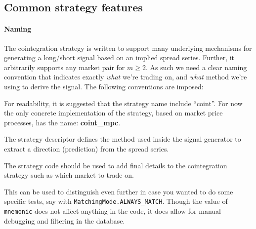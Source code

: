 \subsection{Common strategy features}
\paragraph{Naming}
The cointegration strategy is written to support many underlying mechanisms for
generating a long/short signal based on an implied spread series. Further, it
arbitrarily supports any market pair for $m\geq2$. As such we need a clear
naming convention that indicates exactly \emph{what} we're trading on, and
\emph{what} method we're using to derive the signal. The following conventions
are imposed:
\begin{description}[leftmargin=!, labelwidth=8em]
    \item[\texttt{strategy_name}] For readability, it is suggested
        that the strategy name include ``coint''. For now the only concrete
        implementation of the strategy, based on market price processes, has
        the name: \textbf{coint\_mpc}.
    \item[\texttt{strategy_desc}] The strategy descriptor defines
        the method used inside the signal generator to extract a direction
        (prediction) from the spread series.
    \item[\texttt{strategy_code}] The strategy code should be used to add final details to the cointegration strategy such as which market to trade on.
    \item[\texttt{mnemonic}] This can be used to distinguish even
        further in case you wanted to do some specific tests, say with
        \texttt{MatchingMode.ALWAYS_MATCH}. Though the value of
        \texttt{mnemonic} does not affect anything in the code, it
        does allow for manual debugging and filtering in the database.
\end{description}


